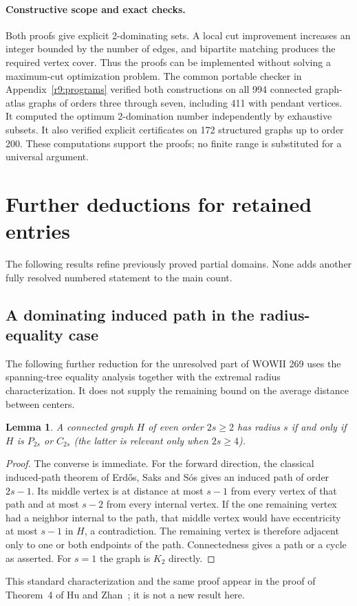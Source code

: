 \documentclass[11pt,a4paper]{article}
\newtheorem{lemma}[theorem]{Lemma}
\theoremstyle{remark}
\begin{document}
\paragraph{Constructive scope and exact checks.}
Both proofs give explicit 2-dominating sets. A local cut improvement
increases an integer bounded by the number of edges, and bipartite
matching produces the required vertex cover. Thus the proofs can be
implemented without solving a maximum-cut optimization problem.
The common portable checker in Appendix~\ref{r9:programs} verified
both constructions on all 994 connected graph-atlas graphs of orders
three through seven, including 411 with pendant vertices. It computed
the optimum 2-domination number independently by exhaustive subsets.
It also verified explicit certificates on 172 structured graphs up to
order 200. These computations support the proofs; no finite range is
substituted for a universal argument.


\section{Further deductions for retained entries}
\label{r9:partials}
The following results refine previously proved partial domains. None
adds another fully resolved numbered statement to the main count.

\subsection{A dominating induced path in the radius-equality case}
\label{r9:sec269-path}
The following further reduction for the unresolved part of WOWII 269
uses the spanning-tree equality analysis together with the extremal
radius characterization. It does not supply the remaining bound on
the average distance between centers.

\begin{lemma}\label{r9:lem-extremal-radius}
A connected graph $H$ of even order $2s\ge2$ has radius $s$
if and only if $H$ is $P_{2s}$ or $C_{2s}$ (the latter is relevant
only when $2s\ge4$).
\end{lemma}
\begin{proof}
The converse is immediate. For the forward direction, the classical
induced-path theorem of Erd\H{o}s, Saks and S\'os gives an induced
path of order $2s-1$. Its middle vertex is at distance at most $s-1$
from every vertex of that path and at most $s-2$ from every internal
vertex. If the one remaining vertex had a neighbor internal to the
path, that middle vertex would have eccentricity at most $s-1$ in
$H$, a contradiction. The remaining vertex is therefore adjacent
only to one or both endpoints of the path. Connectedness gives a
path or a cycle as asserted. For $s=1$ the graph is $K_2$ directly.
\end{proof}
This standard characterization and the same proof appear in the
proof of Theorem~4 of Hu and Zhan~\cite{HuZhan20}; it is not a new
result here.
\end{document}
